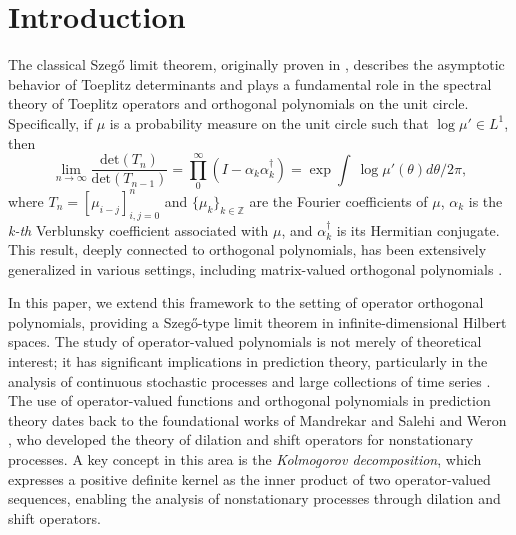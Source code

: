 \documentclass[11pt]{article}
\begin{document}
\section{Introduction}
The classical Szeg\H{o} limit theorem, originally proven in \cite{Sze}, describes the asymptotic behavior of Toeplitz determinants and plays a fundamental role in the spectral theory of Toeplitz operators and orthogonal polynomials on the unit circle. Specifically, if $\mu$ is a probability measure on the unit circle such that $\log \mu' \in L^{1}$, then  
\begin{equation}
\lim_{n \rightarrow{ \infty}}\frac{\mathrm{det}(T_{n})}{\mathrm{det}(T_{n-1})}=\prod_0^{\infty} (I - {\alpha}_k {\alpha}_k^{\dag})
= \exp \int\ \log \mu'(\theta) d \theta /2 \pi ,
\end{equation}
where $T_n=[\mu_{i-j}]_{i,j=0}^n$ and $\{\mu_k\}_{k \in \mathbb{Z}}$ are the Fourier coefficients of $\mu$, $\alpha_k$ is the \textit{k-th} Verblunsky coefficient associated with $\mu$, and ${\alpha}_k^{\dag}$ is its Hermitian conjugate. This result, deeply connected to orthogonal polynomials, has been extensively generalized in various settings, including matrix-valued orthogonal polynomials \cite{DerHK,DelGK}.  

In this paper, we extend this framework to the setting of operator orthogonal polynomials, providing a Szeg\H{o}-type limit theorem in infinite-dimensional Hilbert spaces. The study of operator-valued polynomials is not merely of theoretical interest; it has significant implications in prediction theory, particularly in the analysis of continuous stochastic processes and large collections of time series \cite{Bos, DugBM}. The use of operator-valued functions and orthogonal polynomials in prediction theory dates back to the foundational works of Mandrekar and Salehi \cite{ManS} and Weron \cite{Wer}, who developed the theory of dilation and shift operators for nonstationary processes. A key concept in this area is the \textit{Kolmogorov decomposition}, which expresses a positive definite kernel as the inner product of two operator-valued sequences, enabling the analysis of nonstationary processes through dilation and shift operators.  \\
\end{document}
